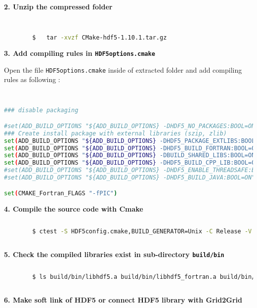 		\textbf{2. Unzip the compressed folder}
		
		\begin{lstlisting}[language=bash]
		

		$	tar -xvzf CMake-hdf5-1.10.1.tar.gz
		\end{lstlisting}
		
		\pagebreak		
		\textbf{3. Add compiling rules in \texttt{HDF5options.cmake}}
		
		Open the file \texttt{HDF5options.cmake} inside of extracted folder and add compiling rules as following : 
		
		\begin{lstlisting}[language=bash]
		

### disable packaging

#set(ADD_BUILD_OPTIONS "${ADD_BUILD_OPTIONS} -DHDF5_NO_PACKAGES:BOOL=ON")
### Create install package with external libraries (szip, zlib)
set(ADD_BUILD_OPTIONS "${ADD_BUILD_OPTIONS} -DHDF5_PACKAGE_EXTLIBS:BOOL=ON")
set(ADD_BUILD_OPTIONS "${ADD_BUILD_OPTIONS} -DHDF5_BUILD_FORTRAN:BOOL=ON")
set(ADD_BUILD_OPTIONS "${ADD_BUILD_OPTIONS} -DBUILD_SHARED_LIBS:BOOL=ON")
set(ADD_BUILD_OPTIONS "${ADD_BUILD_OPTIONS} -DHDF5_BUILD_CPP_LIB:BOOL=ON")
#set(ADD_BUILD_OPTIONS "${ADD_BUILD_OPTIONS} -DHDF5_ENABLE_THREADSAFE:BOOL=ON")
#set(ADD_BUILD_OPTIONS "${ADD_BUILD_OPTIONS} -DHDF5_BUILD_JAVA:BOOL=ON")

set(CMAKE_Fortran_FLAGS "-fPIC")
		\end{lstlisting}
		
		\vspace{1em}
		\textbf{4. Compile the source code with Cmake}
		
		\begin{lstlisting}[language=bash]
		
		$ ctest -S HDF5config.cmake,BUILD_GENERATOR=Unix -C Release -V -O hdf5.log
		
		\end{lstlisting}

		\vspace{1em}		
		\textbf{5. Check the compiled libraries exist in sub-directory \texttt{build/bin}}
		
		\begin{lstlisting}[language=bash]
		
		$ ls build/bin/libhdf5.a build/bin/libhdf5_fortran.a build/bin/libszip.a build/bin/libz.a
		
		\end{lstlisting}
		
		\pagebreak
		\textbf{6. Make soft link of HDF5 or connect HDF5 library with Grid2Grid}
		
